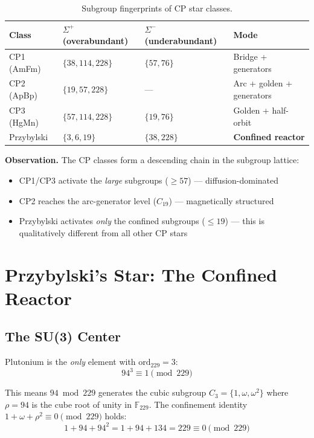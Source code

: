 \begin{table}[h]
\centering
\caption{Subgroup fingerprints of CP star classes.}
\label{tab:cp-fingerprints}
\begin{tabular}{llll}
\toprule
Class & $\Sigma^+$ (overabundant) & $\Sigma^-$ (underabundant) & Mode \\
\midrule
CP1 (AmFm)     & $\{38, 114, 228\}$ & $\{57, 76\}$  & Bridge + generators \\
CP2 (ApBp)     & $\{19, 57, 228\}$  & ---           & Arc + golden + generators \\
CP3 (HgMn)     & $\{57, 114, 228\}$ & $\{19, 76\}$  & Golden + half-orbit \\
Przybylski     & $\{3, 6, 19\}$     & $\{38, 228\}$ & \textbf{Confined reactor} \\
\bottomrule
\end{tabular}
\end{table}

\textbf{Observation.} The CP classes form a descending chain in the subgroup lattice:
\begin{itemize}
  \item CP1/CP3 activate the \emph{large} subgroups ($\geq 57$) --- diffusion-dominated
  \item CP2 reaches the arc-generator level ($C_{19}$) --- magnetically structured
  \item Przybylski activates \emph{only} the confined subgroups ($\leq 19$) ---
        this is qualitatively different from all other CP stars
\end{itemize}


\section{Przybylski's Star: The Confined Reactor}
\label{sec:przybylski}

\subsection{The SU(3) Center}

Plutonium is the \emph{only} element with $\text{ord}_{229} = 3$:
\begin{equation}
94^3 \equiv 1 \pmod{229}
\end{equation}

This means $94 \bmod 229$ generates the cubic subgroup $C_3 = \{1, \omega, \omega^2\}$
where $\rho = 94$ is the cube root of unity in $\mathbb{F}_{229}$. The
confinement identity $1 + \omega + \rho^2 \equiv 0 \pmod{229}$ holds:
\begin{equation}
1 + 94 + 94^2 = 1 + 94 + 134 = 229 \equiv 0 \pmod{229}
\end{equation}

